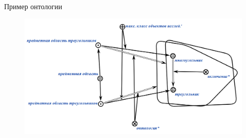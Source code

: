 \begin{frame}{\\Пример онтологии}
	\topline
	\justifying 
	\begin{figure}[H]
		\includegraphics[scale=0.3]{./figures/sd_ontologies/ontology3.png}
	\end{figure}
\end{frame}

